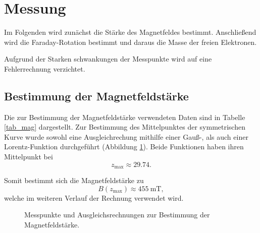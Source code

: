 \section{Messung} %
\label{sec:messung}

Im Folgenden wird zunächst die Stärke des Magnetfeldes bestimmt. 
Anschließend wird die Faraday-Rotation bestimmt und daraus die Masse der freien Elektronen.

Aufgrund der Starken schwankungen der Messpunkte wird auf eine Fehlerrechnung verzichtet.

\subsection{Bestimmung der Magnetfeldstärke} %
\label{sub:bestimmung_der_magnetfeldstärke}

Die zur Bestimmung der Magnetfeldstärke verwendeten Daten sind in Tabelle \ref{tab_mag} dargestellt.
Zur Bestimmung des Mittelpunktes der symmetrischen Kurve wurde sowohl eine Ausgleichrechung mithilfe einer Gauß-, als auch einer Lorentz-Funktion durchgeführt (Abbildung \ref{fig_mag}).
Beide Funktionen haben ihren Mittelpunkt bei
\begin{equation}
	z_\text{max} \approx 29.74.
\end{equation}

Somit bestimmt sich die Magnetfeldstärke zu
\begin{equation}
	B(z_\text{max}) \approx \SI{455}{\milli\tesla},
\end{equation}
welche im weiteren Verlauf der Rechnung verwendet wird.

\begin{figure}
	\caption{Messpunkte und Ausgleichsrechnungen zur Bestimmung der Magnetfeldstärke.}
	\label{fig_mag}
\end{figure}

